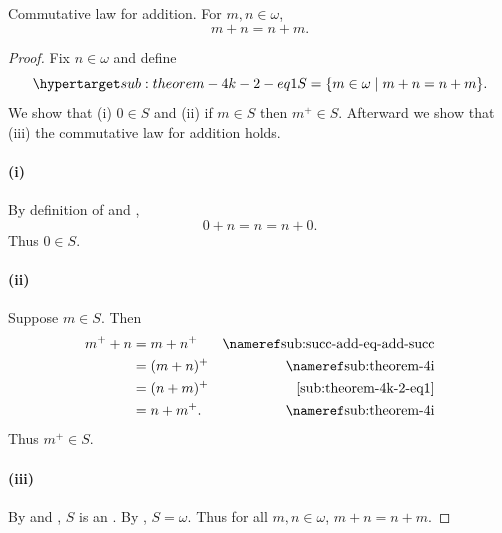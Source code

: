 \documentclass{report}
\begin{document}
\subsection{}%
\label{sub:theorem-4k-2}

\begin{theorem}[4K-2]

  Commutative law for addition.
  For $m, n \in \omega$, $$m + n = n + m.$$

\end{theorem}

\begin{proof}


  Fix $n \in \omega$ and define
    \begin{equation}
      \hyperlabel{sub:theorem-4k-2-eq1}
      S = \{m \in \omega \mid m + n = n + m\}.
    \end{equation}
  We show that (i) $0 \in S$ and (ii) if $m \in S$ then $m^+ \in S$.
  Afterward we show that (iii) the commutative law for addition holds.

  \paragraph{(i)}%

    By definition of  and
      , $$0 + n = n = n + 0.$$
    Thus $0 \in S$.

  \paragraph{(ii)}%

    Suppose $m \in S$.
    Then
      \begin{align*}
        m^+ + n
          & = m + n^+ & \textref{sub:succ-add-eq-add-succ} \\
          & = (m + n)^+ & \textref{sub:theorem-4i} \\
          & = (n + m)^+ & \eqref{sub:theorem-4k-2-eq1} \\
          & = n + m^+. & \textref{sub:theorem-4i}
      \end{align*}
    Thus $m^+ \in S$.

  \paragraph{(iii)}%

    By  and , $S$
      is an .
    By , $S = \omega$.
    Thus for all $m, n \in \omega$, $m + n = n + m$.

\end{proof}
\end{document}
